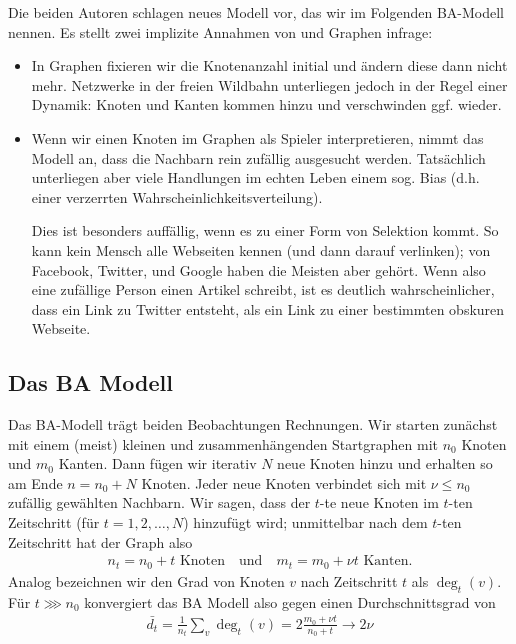 Die beiden Autoren schlagen neues Modell vor, das wir im Folgenden BA-Modell nennen.
Es stellt zwei implizite Annahmen von \Gnp und \Gnm Graphen infrage:
\begin{itemize}
    \item
          In \Gnp Graphen fixieren wir die Knotenanzahl initial und ändern diese dann nicht mehr.
          Netzwerke in der freien Wildbahn unterliegen jedoch in der Regel einer Dynamik:
          Knoten und Kanten kommen hinzu und verschwinden ggf. wieder.

    \item
          Wenn wir einen Knoten im \Gnp Graphen als Spieler interpretieren, nimmt das Modell an, dass die Nachbarn rein zufällig ausgesucht werden.
          Tatsächlich unterliegen aber viele Handlungen im echten Leben einem sog. Bias (d.h. einer verzerrten Wahrscheinlichkeitsverteilung).

          Dies ist besonders auffällig, wenn es zu einer Form von Selektion kommt.
          So kann kein Mensch alle Webseiten kennen (und dann darauf verlinken); von Facebook, Twitter, und Google haben die Meisten aber gehört.
          Wenn also eine zufällige Person einen Artikel schreibt, ist es deutlich wahrscheinlicher, dass ein Link zu Twitter entsteht, als ein Link zu einer bestimmten obskuren Webseite.
\end{itemize}

\subsection{Das BA Modell}
Das  BA-Modell trägt beiden Beobachtungen Rechnungen.
Wir starten zunächst mit einem (meist) kleinen und zusammenhängenden Startgraphen mit $n_0$ Knoten und $m_0$ Kanten.
Dann fügen wir iterativ $N$ neue Knoten hinzu und erhalten so am Ende $n = n_0 + N$ Knoten.
Jeder neue Knoten verbindet sich mit $\nu \le n_0$ zufällig gewählten Nachbarn.
Wir sagen, dass der $t$-te neue Knoten im $t$-ten Zeitschritt (für $t = 1,2, \ldots, N$) hinzufügt wird;
unmittelbar nach dem $t$-ten Zeitschritt hat der Graph also
\begin{align}
    n_t = n_0 + t \text{ Knoten} \quad \text{und} \quad
    m_t = m_0 + \nu t \text{ Kanten}.
\end{align}
Analog bezeichnen wir den Grad von Knoten $v$ nach Zeitschritt $t$ als $\deg_t(v)$.
Für $t \ggg n_0$ konvergiert das BA Modell also gegen einen Durchschnittsgrad von
\begin{align}
    \bar{d_t} = \frac{1}{n_t} \sum_{v} \deg_t(v) = 2 \frac{m_0 + \nu t}{n_0 + t} \to 2 \nu
\end{align}

